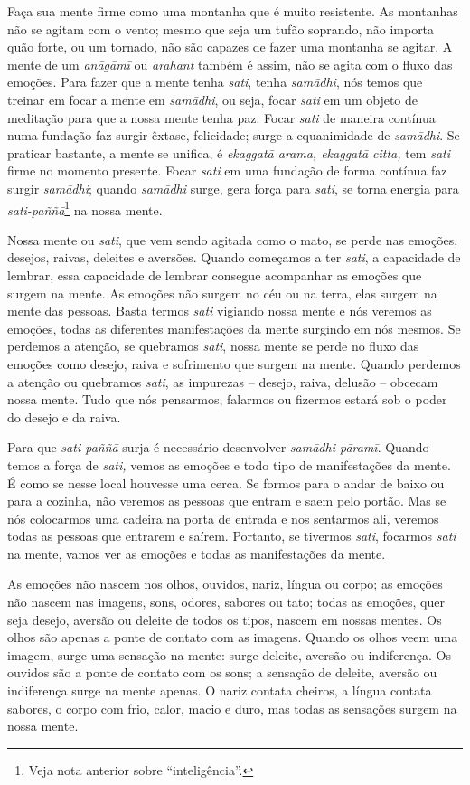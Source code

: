 Faça sua mente firme como uma montanha que é muito resistente. As
montanhas não se agitam com o vento; mesmo que seja um tufão soprando,
não importa quão forte, ou um tornado, não são capazes de fazer uma
montanha se agitar. A mente de um \textit{anāgāmī} ou
\textit{arahant} também é assim, não se agita com o fluxo das emoções.
Para fazer que a mente tenha \textit{sati}, tenha \textit{samādhi},
nós temos que treinar em focar a mente em \textit{samādhi}, ou seja,
focar \textit{sati} em um objeto de meditação para que a nossa mente
tenha paz. Focar \textit{sati} de maneira contínua numa fundação faz
surgir êxtase, felicidade; surge a equanimidade de \textit{samādhi}.
Se praticar bastante, a mente se unifica, é \textit{ekaggatā arama,
ekaggatā citta,} tem \textit{sati} firme no momento presente. Focar
\textit{sati} em uma fundação de forma contínua faz surgir
\textit{samādhi}; quando \textit{samādhi} surge, gera força para
\textit{sati}, se torna energia para
\textit{sati-paññā}\footnote{Veja nota anterior sobre
“inteligência”.} na nossa mente.

Nossa mente ou \textit{sati}, que vem sendo agitada como o mato, se
perde nas emoções, desejos, raivas, deleites e aversões. Quando
começamos a ter \textit{sati}, a capacidade de lembrar, essa capacidade
de lembrar consegue acompanhar as emoções que surgem na mente. As
emoções não surgem no céu ou na terra, elas surgem na mente das
pessoas. Basta termos \textit{sati} vigiando nossa mente e nós veremos
as emoções, todas as diferentes manifestações da mente surgindo em nós
mesmos. Se perdemos a atenção, se quebramos \textit{sati}, nossa mente
se perde no fluxo das emoções como desejo, raiva e sofrimento que
surgem na mente. Quando perdemos a atenção ou quebramos \textit{sati},
as impurezas – desejo, raiva, delusão – obcecam nossa mente. Tudo que
nós pensarmos, falarmos ou fizermos estará sob o poder do desejo e da
raiva.

Para que \textit{sati-paññā} surja é necessário desenvolver
\textit{samādhi pāramī}. Quando temos a força de \textit{sati,}
vemos as emoções e todo tipo de manifestações da mente. É como se nesse
local houvesse uma cerca. Se formos para o andar de baixo ou para a
cozinha, não veremos as pessoas que entram e saem pelo portão. Mas se
nós colocarmos uma cadeira na porta de entrada e nos sentarmos ali,
veremos todas as pessoas que entrarem e saírem. Portanto, se tivermos
\textit{sati}, focarmos \textit{sati} na mente, vamos ver as emoções e
todas as manifestações da mente.

As emoções não nascem nos olhos, ouvidos, nariz, língua ou corpo; as
emoções não nascem nas imagens, sons, odores, sabores ou tato; todas as
emoções, quer seja desejo, aversão ou deleite de todos os tipos, nascem
em nossas mentes. Os olhos são apenas a ponte de contato com as
imagens. Quando os olhos veem uma imagem, surge uma sensação na mente:
surge deleite, aversão ou indiferença. Os ouvidos são a ponte de
contato com os sons; a sensação de deleite, aversão ou indiferença
surge na mente apenas. O nariz contata cheiros, a língua contata
sabores, o corpo com frio, calor, macio e duro, mas todas as sensações
surgem na nossa mente.

